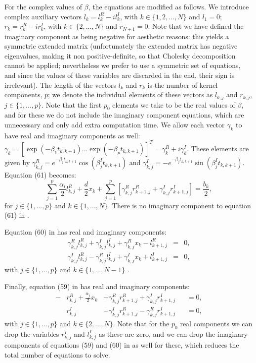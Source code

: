 \documentclass[manuscript, letterpaper]{aastex6}
\begin{document}
For the complex values of $\beta$, the equations are modified as follows.  We introduce complex
auxiliary vectors $l_k = l_{k}^R - i l_{k}^I$, with $k \in \{1,2,...,N\}$ and $l_1 = 0$; $r_k =
r_k^R - i r_k^I$, with $k \in \{2,...,N\}$ and $r_{N+1} = 0$.  Note that we have defined the
imaginary component as being negative for aesthetic reasons:  this yields a symmetric extended
matrix (unfortunately the extended matrix has negative eigenvalues, making it non positive-definite,
so that Cholesky decomposition cannot be applied; nevertheless we prefer to use a symmetric
set of equations, and since the values of these variables are discarded in the end, their sign
is irrelevant).  The length of the vectors $l_k$ and $r_k$
is the number of kernel components, $p$;  we denote the individual elements of these vectors
as $l_{k,j}$ and $r_{k,j}$, $j \in \{1,...,p\}$.  Note that the first $p_0$ elements we take
to be the real values of $\beta$, and for these we do not include the imaginary component
equations, which are unnecessary and only add extra computation time.  We allow each vector $\gamma_k$ to have real and imaginary
components as well:  $\gamma_k = \left[\exp{(-\beta_1 t_{k,k+1})} ... \exp{(-\beta_p t_{k,k+1})}\right]^T
 = \gamma_k^R + i \gamma_k^I.$  These elements are given by $\gamma_{k,j}^R = e^{-\beta_j t_{k,k+1}}
\cos{(\beta_j^I t_{k,k+1})}$ and $\gamma_{k,j}^I = -e^{-\beta_j t_{k,k+1}}\sin{(\beta_j^I t_{k,k+1})}$.
Equation (61) becomes:
\begin{equation} \label{Amb61}
\sum_{j=1}^p \frac{\alpha_i}{2} l_{k,j}^R + \frac{d}{2} x_k + \sum_{j=1}^p \left[
\gamma_{k,j}^R r_{k+1,j}^R + \gamma_{k,j}^I r_{k+1,j}^I\right] = \frac{b_k}{2},
\end{equation}
for $j \in \{1,...,p\}$ and $k \in \{1,...,N\}$.  There is no imaginary component to equation (61)
in \citet{Ambikasaran2015}.

Equation (60) in \citet{Ambikasaran2015} has real and imaginary components:
\begin{eqnarray} \label{Amb60}
\gamma_{k,j}^R l_{k,j}^R +\gamma_{k,j}^I l_{k,j}^I + \gamma_{k,j}^R x_k - l_{k+1,j}^R &=& 0,\\
\gamma_{k,j}^I l_{k,j}^R -\gamma_{k,j}^R l_{k,j}^I + \gamma_{k,j}^I x_k + l_{k+1,j}^I &=& 0,
\end{eqnarray}
with $j \in \{1,...,p\}$ and $k \in \{1,...,N-1\}$
\citep[note that we have shifted the indices of this equation by one from the indexing using in][]{Ambikasaran2015}.

Finally, equation (59) in \citet{Ambikasaran2015} has real and imaginary components:
\begin{align} \label{Amb59}
-&r_{k,j}^R + \frac{\alpha_j}{2} x_k &+ \gamma_{k,j}^R r_{k+1,j}^R + \gamma_{k,j}^I r_{k+1,j}^I &&=0,\\
 &r_{k,j}^I &+ \gamma_{k,j}^I r_{k+1,j}^R - \gamma_{k,j}^R r_{k+1,j}^I &&=0,
\end{align}
with $j \in \{1,...,p\}$ and $k \in \{2,...,N\}$.  Note that for the $p_0$ real components
we can drop the variables $r_{k,j}^I$ and $l_{k,j}^I$ as these are zero, and we can drop the
imaginary components of equations (59) and (60) in \citet{Ambikasaran2015} as well for these, which reduces the total number
of equations to solve.
\end{document}
